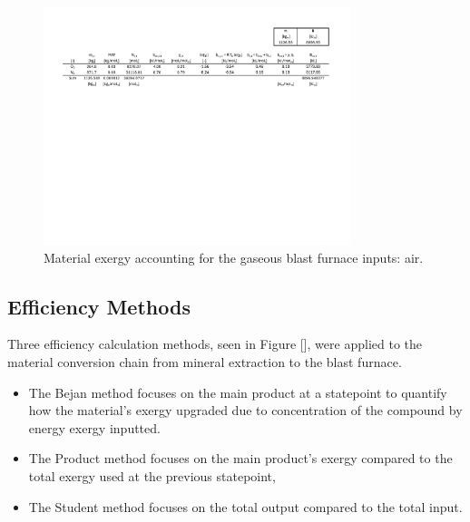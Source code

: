 \documentclass[energies,article,submit,pdftex,moreauthors]{Definitions/mdpi}
\begin{document}
\begin{figure}[h!]
  \centering
  \includegraphics[width=0.8\textwidth]{images/Air BF Inputs.pdf}
  \caption{Material exergy accounting for the gaseous blast furnace inputs: air.}
  \label{fig:Gaseous Blast Furnace Inputs}
\end{figure}

\subsection{Efficiency Methods}

Three efficiency calculation methods,
seen in Figure [],
were applied to the material conversion chain
from mineral extraction
to the blast furnace.

\begin{itemize}
  \item The Bejan method focuses on the main product
  at a statepoint
  to quantify how the material's exergy upgraded
  due to concentration of the compound
  by energy exergy inputted.
  \item The Product method focuses on the main product's exergy
  compared to the total exergy used
  at the previous statepoint,
  \item The Student method focuses on the total output
  compared to the total input.
\end{itemize}
\end{document}
